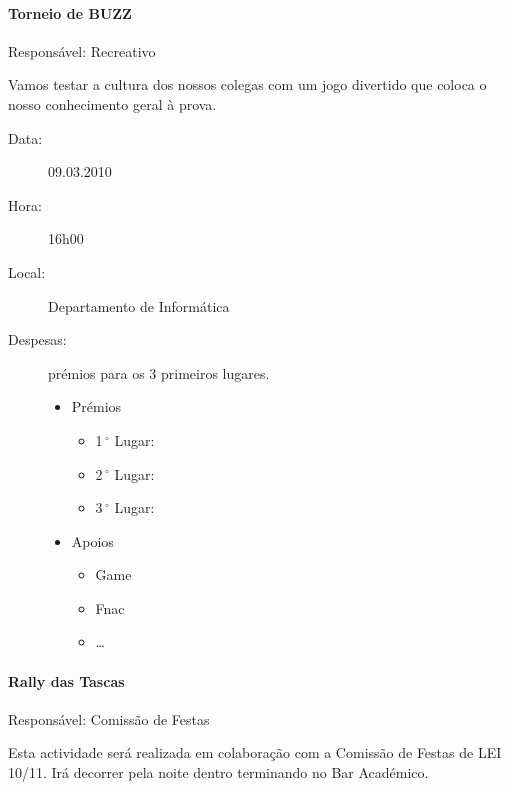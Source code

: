 \paragraph{Torneio de BUZZ}
Responsável: Recreativo

Vamos testar a cultura dos nossos colegas com um jogo divertido que coloca o nosso conhecimento geral à prova.

\begin{description}
	\item[Data:] 09.03.2010
	\item[Hora:] 16h00
	\item[Local:] Departamento de Informática
	\item[Despesas:] prémios para os 3 primeiros lugares.
	\begin{itemize}
		\item Prémios
		\begin{itemize}
			\item 1$\,^{\circ}$ Lugar:
			\item 2$\,^{\circ}$ Lugar:
			\item 3$\,^{\circ}$ Lugar:
		\end{itemize}
		\item Apoios
		\begin{itemize}
			\item Game
			\item Fnac
			\item \dots  
		\end{itemize}
	\end{itemize}
\end{description}


\paragraph{Rally das Tascas}
Responsável: Comissão de Festas

Esta actividade será realizada em colaboração com a Comissão de Festas de LEI 10/11. Irá decorrer pela noite dentro terminando no Bar Académico.

